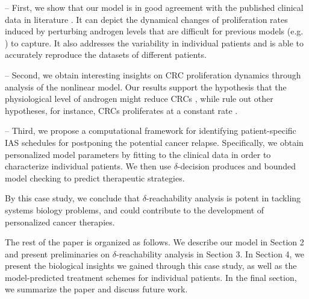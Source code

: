 -- First, we show that our model is in good agreement with the published clinical data in literature \cite{ bruchovsky06,bruchovsky07}. It can depict the dynamical changes of proliferation rates induced by perturbing androgen levels that are difficult for previous models (e.g. \cite{ideta08}) to capture. It also addresses the variability in individual patients and is able to accurately reproduce the datasets of different patients.  

-- Second, we obtain interesting insights on CRC proliferation dynamics through analysis of the nonlinear model. Our results support the hypothesis that the physiological level of androgen might reduce CRCs \cite{ideta08}, while rule out other hypotheses, for instance, CRCs proliferates at a constant rate \cite{portz12}. 

-- Third, we propose a computational framework for identifying patient-specific IAS schedules for postponing the potential cancer relapse. Specifically, we obtain personalized model parameters by fitting to the clinical data in order to characterize individual patients. We then use $\delta$-decision produces and bounded model checking to predict therapeutic strategies. 

By this case study, we conclude that $\delta$-reachability analysis is potent in tackling systems biology problems, and could contribute to the development of personalized cancer therapies.


The rest of the paper is organized as follows. We describe our model in Section 2 and present preliminaries on $\delta$-reachability analysis in Section 3. In Section 4, we present the biological insights we gained through this case study, as well as the model-predicted treatment schemes for individual patients. In the final section, we summarize the paper and discuss future work.
